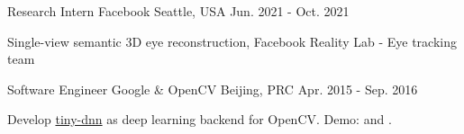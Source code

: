 


\begin{cventries}


\cventry
{Research Intern} %
{Facebook} %
{Seattle, USA} %
{Jun. 2021 - Oct. 2021} %
{ %
\begin{cvitems}
\item {Single-view semantic 3D eye reconstruction, Facebook Reality Lab - Eye tracking team}
\end{cvitems}
}

\cventry
{Software Engineer} %
{Google \& OpenCV} %
{Beijing, PRC} %
{Apr. 2015 - Sep. 2016} %
{ %
\begin{cvitems}
\item {Develop \href{https://github.com/tiny-dnn/tiny-dnn}{tiny-dnn} as deep learning backend for OpenCV. Demo: \href{https://www.youtube.com/watch?v=Mc20rTYdXTE}{} and \href{https://drive.google.com/open?id=0B-RYa1FDOrYXVUEzcG1mdnl5a3M}{}.
}
\end{cvitems}
}


\end{cventries}
